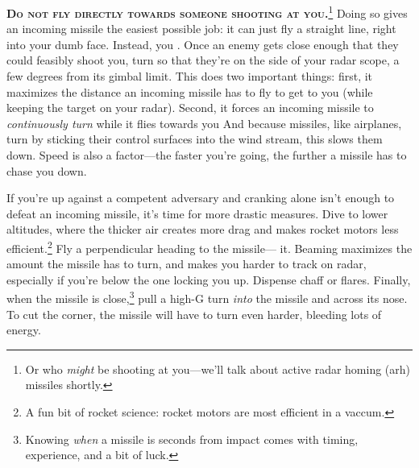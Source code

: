 \textbf{\textsc{Do not fly directly towards someone shooting at
you.}}\punckern\footnote{Or who \emph{might} be shooting at you---we'll talk
about active radar homing \ac{(arh)} missiles shortly.}
Doing so gives an incoming missile the easiest possible job:
it can just fly a straight line, right into your dumb face.
Instead, you .
Once an enemy gets close enough that they could feasibly shoot you,
turn so that they're on the side of your radar scope,
a few degrees from its gimbal limit.
This does two important things:
first, it maximizes the distance an incoming missile has to fly to get to you
(while keeping the target on your radar).
Second, it forces an incoming missile to \emph{continuously turn} while it
flies towards you
And because missiles, like airplanes, turn by sticking their control surfaces
into the wind stream, this slows them down.
Speed is also a factor---the faster you're going,
the further a missile has to chase you down.

If you're up against a competent adversary and cranking alone isn't enough to
defeat an incoming missile, it's time for more drastic measures.
Dive to lower altitudes, where the thicker air creates more drag and makes
rocket motors less efficient.\punckern\footnote{A fun bit of rocket
science: rocket motors are most efficient in a vaccum.}
Fly a perpendicular heading to the missile--- it.
Beaming maximizes the amount the missile has to turn,
and makes you harder to track on radar,
especially if you're below the one locking you up.
Dispense chaff or flares.
Finally, when the missile is close,\punckern\footnote{Knowing \emph{when} a
missile is seconds from impact comes with timing, experience, and a bit of luck.}
pull a high-G turn \emph{into} the missile and across its nose.
To cut the corner, the missile will have to turn even harder,
bleeding lots of energy.

